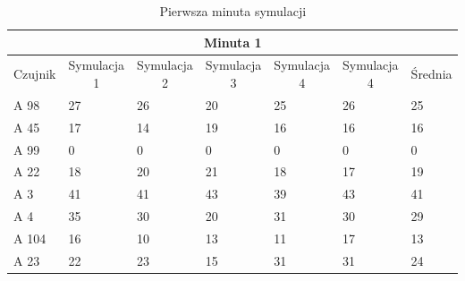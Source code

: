 \documentclass[a4paper,12pt]{article}
\begin{document}
\begin{table}[!h]
	\centering

\begin{tabular}{|l|l|l|l|l|l|l|}
\hline
\multicolumn{7}{|c|}{Minuta 1}                                                                                                                                                                                                                   \\ \hline
\multicolumn{1}{|c|}{Czujnik} & \multicolumn{1}{c|}{Symulacja 1} & \multicolumn{1}{c|}{Symulacja 2} & \multicolumn{1}{c|}{Symulacja 3} & \multicolumn{1}{c|}{Symulacja 4} & \multicolumn{1}{c|}{Symulacja 4} & \multicolumn{1}{c|}{Średnia} \\ \hline
A 98                          & 27                               & 26                               & 20                              & 25                             & 26                             & 25                                     \\ \hline
A 45                          & 17                               & 14                               & 19                              & 16                             & 16                             & 16                                     \\ \hline
A 99                          & 0                                & 0                                & 0                               & 0                              & 0                              & 0                                      \\ \hline
A 22                          & 18                               & 20                               & 21                              & 18                             & 17                             & 19                                     \\ \hline
A 3                           & 41                               & 41                               & 43                              & 39                             & 43                             & 41                                     \\ \hline
A 4                           & 35                               & 30                               & 20                              & 31                             & 30                             & 29                                     \\ \hline
A 104                         & 16                               & 10                               & 13                              & 11                             & 17                             & 13                                     \\ \hline
A 23                          & 22                               & 23                               & 15                              & 31                             & 31                             & 24                                     \\ \hline

\end{tabular}
\caption{Pierwsza minuta symulacji}
\label{tab:1}
\end{table}
\end{document}
